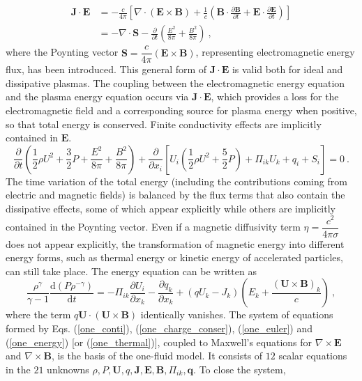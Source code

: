 \documentclass[12pt,a4paper]{article}
\renewcommand{\vec}[1]{\boldsymbol{#1}}
\newcommand{\dif}{\mathrm{d}}
\begin{document}
\begin{align*}
\vec{J}\cdot\vec{E} &= -\frac{c}{4\pi} \left[\nabla \cdot (\vec{E} \times \vec{B}) +\frac{1}{c} \left(\vec{B}\cdot \frac{\partial \vec{B} }{\partial t} +\vec{E}\cdot \frac{\partial \vec{E} }{\partial t}\right) \right]  \\
&= -\nabla\cdot \vec{S} - \frac{\partial }{\partial t}\left(\frac{E^2 }{8\pi} +\frac{B^2 }{8\pi}\right) ~,
\end{align*}
where the Poynting vector $\vec{S} = \dfrac{c}{4\pi}(\vec{E}\times \vec{B})$, representing electromagnetic energy flux, has been introduced. This general form of $\vec{J}\cdot \vec{E}$ is valid both for ideal and dissipative plasmas. The coupling between the electromagnetic energy equation and the plasma energy equation occurs via $\vec{J}\cdot \vec{E}$, which provides a loss for the electromagnetic field and a corresponding source for plasma energy when positive, so that total energy is conserved. Finite conductivity effects are implicitly contained in $\vec{E}$.
\begin{equation}
\frac{\partial }{\partial t}\left( \frac{1}{2} \rho U^2 +\frac{3}{2} P +\frac{E^2 }{8\pi} +\frac{B^2 }{8\pi}\right) +\frac{\partial }{\partial x_i} \left[U_i\left(\frac{1}{2} \rho U^2 +\frac{5}{2} P \right) +\Pi_{ik}U_k +q_i +S_i\right] = 0 ~.
\end{equation}
The time variation of the total energy (including the contributions coming from electric and magnetic fields) is balanced by the flux terms that also contain the dissipative effects, some of which appear explicitly while others are implicitly contained in the Poynting vector. Even if a magnetic diffusivity term $\eta = \dfrac{c^2}{4\pi \sigma}$ does not appear explicitly, the transformation of magnetic energy into different energy forms, such as thermal energy or kinetic energy of accelerated particles, can still take place. The energy equation can be written as
\begin{equation}
\frac{\rho^\gamma}{\gamma-1} \frac{\dif \left( P\rho^{-\gamma}\right)}{\dif t} = -\Pi_{ik} \frac{\partial U_i}{\partial x_k}  -\frac{\partial q_k}{\partial x_k} +(qU_k -J_k)\left(E_k +\frac{(\vec{U}\times \vec{B})_k}{c} \right) ~,
\label{one_thermal}
\end{equation}
where the term $q\vec{U}\cdot (\vec{U}\times \vec{B})$ identically vanishes. The system of equations formed by Eqs. (\ref{one_conti}), (\ref{one_charge_conser}), (\ref{one_euler}) and (\ref{one_energy}) [or (\ref{one_thermal})], coupled to Maxwell’s equations for $\nabla \times \vec{E}$ and $\nabla \times \vec{B}$, is the basis of the one-fluid model. It consists of $12$ scalar equations in the $21$ unknowns $\rho, P, \vec{U}, q, \vec{J}, \vec{E}, \vec{B}, \Pi_{ik}, \vec{q}$. To close the system, 
\end{document}
